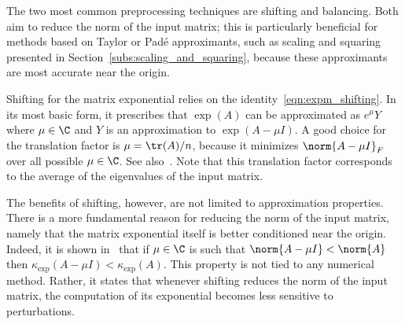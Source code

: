 The two most common preprocessing techniques are shifting and balancing. Both aim to reduce the norm of the input matrix; this is particularly beneficial for methods based on Taylor or Padé approximants, such as scaling and squaring presented in Section~\ref{subs:scaling_and_squaring}, because these approximants are most accurate near the origin.
\smallskip 

Shifting for the matrix exponential relies on the identity~\eqref{eqn:expm_shifting}. In its most basic form, it prescribes that $\exp(A)$ can be approximated as $e^{\mu}Y$ where $\mu\in\C$ and $Y$ is an approximation to $\exp(A-\mu I)$. A good choice for the translation factor is $\mu=\tr(A)/n$, because it minimizes $\norm{A-\mu I}_F$ over all possible $\mu\in\C$. See also~\cite[Thm.~4.21]{higham:matfun_book}. %
Note that this translation factor corresponds to the average of the eigenvalues of the input matrix.

The benefits of shifting, however, are not limited to approximation properties. There is a more fundamental reason for reducing the norm of the input matrix, namely that the matrix exponential itself is better conditioned near the origin. Indeed, it is shown in~\cite[Thm.~10.18]{higham:matfun_book} that if $\mu\in\C$ is such that $\norm{A-\mu I}<\norm{A}$ then $\kappa_{\exp}(A-\mu I)<\kappa_{\exp}(A)$. This property is not tied to any numerical method. Rather, it states that whenever shifting reduces the norm of the input matrix, the computation of its exponential becomes less sensitive to perturbations.
\smallskip 

